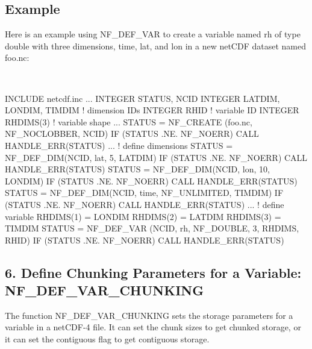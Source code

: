 \subsection*{Example }

Here is an example using N\+F\+\_\+\+D\+E\+F\+\_\+\+V\+AR to create a variable named rh of type double with three dimensions, time, lat, and lon in a new net\+C\+DF dataset named foo.\+nc\+:

 

I\+N\+C\+L\+U\+DE \textquotesingle{}netcdf.\+inc\textquotesingle{} ... I\+N\+T\+E\+G\+ER S\+T\+A\+T\+US, N\+C\+ID I\+N\+T\+E\+G\+ER L\+A\+T\+D\+IM, L\+O\+N\+D\+IM, T\+I\+M\+D\+IM ! dimension I\+Ds I\+N\+T\+E\+G\+ER R\+H\+ID ! variable ID I\+N\+T\+E\+G\+ER R\+H\+D\+I\+M\+S(3) ! variable shape ... S\+T\+A\+T\+US = N\+F\+\_\+\+C\+R\+E\+A\+TE (\textquotesingle{}foo.\+nc\textquotesingle{}, N\+F\+\_\+\+N\+O\+C\+L\+O\+B\+B\+ER, N\+C\+ID) IF (S\+T\+A\+T\+US .NE. N\+F\+\_\+\+N\+O\+E\+RR) C\+A\+LL H\+A\+N\+D\+L\+E\+\_\+\+E\+R\+R(\+S\+T\+A\+T\+U\+S) ... ! define dimensions S\+T\+A\+T\+US = N\+F\+\_\+\+D\+E\+F\+\_\+\+D\+IM(N\+C\+ID, \textquotesingle{}lat\textquotesingle{}, 5, L\+A\+T\+D\+IM) IF (S\+T\+A\+T\+US .NE. N\+F\+\_\+\+N\+O\+E\+RR) C\+A\+LL H\+A\+N\+D\+L\+E\+\_\+\+E\+R\+R(\+S\+T\+A\+T\+U\+S) S\+T\+A\+T\+US = N\+F\+\_\+\+D\+E\+F\+\_\+\+D\+IM(N\+C\+ID, \textquotesingle{}lon\textquotesingle{}, 10, L\+O\+N\+D\+IM) IF (S\+T\+A\+T\+US .NE. N\+F\+\_\+\+N\+O\+E\+RR) C\+A\+LL H\+A\+N\+D\+L\+E\+\_\+\+E\+R\+R(\+S\+T\+A\+T\+U\+S) S\+T\+A\+T\+US = N\+F\+\_\+\+D\+E\+F\+\_\+\+D\+IM(N\+C\+ID, \textquotesingle{}time\textquotesingle{}, N\+F\+\_\+\+U\+N\+L\+I\+M\+I\+T\+ED, T\+I\+M\+D\+IM) IF (S\+T\+A\+T\+US .NE. N\+F\+\_\+\+N\+O\+E\+RR) C\+A\+LL H\+A\+N\+D\+L\+E\+\_\+\+E\+R\+R(\+S\+T\+A\+T\+U\+S) ... ! define variable R\+H\+D\+I\+M\+S(1) = L\+O\+N\+D\+IM R\+H\+D\+I\+M\+S(2) = L\+A\+T\+D\+IM R\+H\+D\+I\+M\+S(3) = T\+I\+M\+D\+IM S\+T\+A\+T\+US = N\+F\+\_\+\+D\+E\+F\+\_\+\+V\+AR (N\+C\+ID, \textquotesingle{}rh\textquotesingle{}, N\+F\+\_\+\+D\+O\+U\+B\+LE, 3, R\+H\+D\+I\+MS, R\+H\+ID) IF (S\+T\+A\+T\+US .NE. N\+F\+\_\+\+N\+O\+E\+RR) C\+A\+LL H\+A\+N\+D\+L\+E\+\_\+\+E\+R\+R(\+S\+T\+A\+T\+U\+S)

\subsection*{6. Define Chunking Parameters for a Variable\+: {\ttfamily N\+F\+\_\+\+D\+E\+F\+\_\+\+V\+A\+R\+\_\+\+C\+H\+U\+N\+K\+I\+NG} }

The function N\+F\+\_\+\+D\+E\+F\+\_\+\+V\+A\+R\+\_\+\+C\+H\+U\+N\+K\+I\+NG sets the storage parameters for a variable in a net\+C\+D\+F-\/4 file. It can set the chunk sizes to get chunked storage, or it can set the contiguous flag to get contiguous storage.

